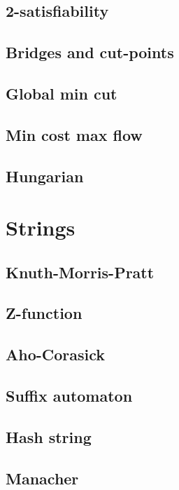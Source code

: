 \documentclass[11pt]{article}
\begin{document}
\subsection{2-satisfiability}

\subsection{Bridges and cut-points}

\subsection{Global min cut}

\subsection{Min cost max flow}

\subsection{Hungarian}


\section{Strings}
\subsection{Knuth-Morris-Pratt}

\subsection{Z-function}

\subsection{Aho-Corasick}

\subsection{Suffix automaton}

\subsection{Hash string}

\subsection{Manacher}

\end{document}
